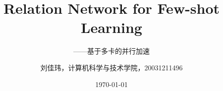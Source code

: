 \title{Relation Network for Few-shot Learning}
\subtitle{——基于多卡的并行加速}
\date{\today}
\author{刘佳玮，计算机科学与技术学院，20031211496}
